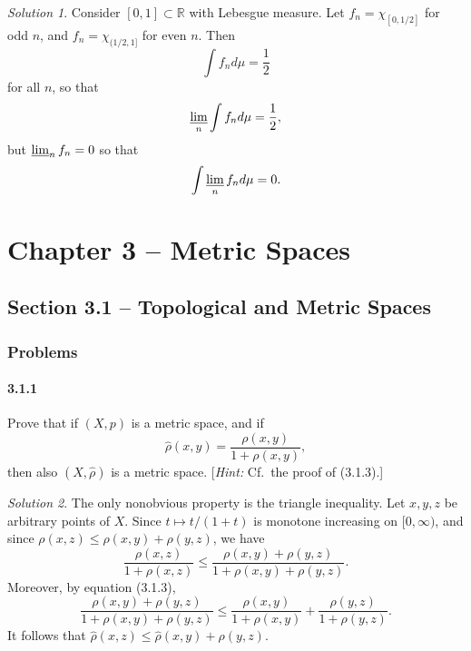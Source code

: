 \documentclass{report}
\newcommand{\bb}[1]{\mathbb{#1}}
\theoremstyle{remark}
\newtheorem*{solution}{Solution}
\begin{document}
\begin{solution}
  Consider $[0,1] \subset \bb R$ with Lebesgue measure. Let $f_n = \chi_{[0,1/2]}$ for odd $n$, and $f_n = \chi_{(1/2,1]}$ for even $n$. Then
  \begin{equation*}
    \int f_n d\mu = \frac{1}{2}
  \end{equation*}
  for all $n$, so that
  \begin{equation*}
    \varliminf_n \int f_n d\mu = \frac{1}{2},
  \end{equation*}
  but $\varliminf_n f_n = 0$ so that
  \begin{equation*}
    \int \varliminf_n f_n d\mu = 0.
  \end{equation*}
\end{solution}

\chapter*{Chapter 3 -- Metric Spaces}

\section*{Section 3.1 -- Topological and Metric Spaces}

\subsection*{Problems}

\subsubsection*{3.1.1}
Prove that if $(X,p)$ is a metric space, and if
\begin{equation*}
  \hat \rho(x,y) = \frac{\rho(x,y)}{1 + \rho(x,y)},
\end{equation*}
then also $(X,\hat \rho)$ is a metric space. [\emph{Hint:} Cf.\ the proof of (3.1.3).]

\begin{solution}
  The only nonobvious property is the triangle inequality. Let $x,y,z$ be arbitrary points of $X$. Since $t \mapsto t/(1+t)$ is monotone increasing on $[0,\infty)$, and since $\rho(x,z) \le \rho(x,y) + \rho(y,z)$, we have
  \begin{equation*}
    \frac{\rho(x,z)}{1 + \rho(x,z)} \le \frac{\rho(x,y) + \rho(y,z)}{1 + \rho(x,y) + \rho(y,z)}.
  \end{equation*}
  Moreover, by equation (3.1.3),
  \begin{equation*}
    \frac{\rho(x,y) + \rho(y,z)}{1 + \rho(x,y) + \rho(y,z)} \le \frac{\rho(x,y)}{1 + \rho(x,y)} + \frac{\rho(y,z)}{1 + \rho(y,z)}.
  \end{equation*}
  It follows that $\hat \rho(x,z) \le \hat \rho(x,y) + \rho(y,z)$.
\end{solution}
\end{document}
